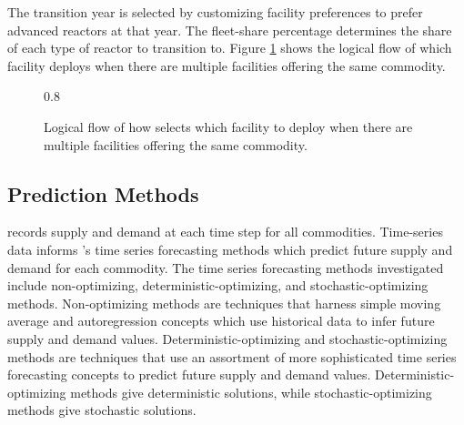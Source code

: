 The transition year is selected by customizing facility 
preferences to prefer advanced reactors at that year.
The fleet-share percentage determines the
share of each type of reactor to transition to. 
Figure \ref{fig:deployflow} shows the logical flow of
which facility \deploy deploys when there are multiple facilities 
offering the same commodity. 

\begin{figure}[]
	\centering
	 {0.8\height}{
    }
	
    \caption{Logical flow of how \deploy 
	selects which facility to deploy when there are multiple facilities 
	offering the same commodity.}
	\label{fig:deployflow}
\end{figure}

\subsection{Prediction Methods}
\label{sec:pm}
\deploy records supply and demand at each time step for all 
commodities. Time-series data informs \deploy's time series 
forecasting methods which predict future supply and demand for each 
commodity.  
The time series forecasting methods investigated include non-optimizing, 
deterministic-optimizing, and stochastic-optimizing methods. 
Non-optimizing methods are techniques that harness 
simple moving average and autoregression concepts which use 
historical data to infer future supply and demand values. 
Deterministic-optimizing and stochastic-optimizing 
methods are techniques 
that use an assortment of more sophisticated time series forecasting 
concepts to predict future supply and demand values. 
Deterministic-optimizing methods give deterministic solutions,
while stochastic-optimizing methods give stochastic solutions. 

